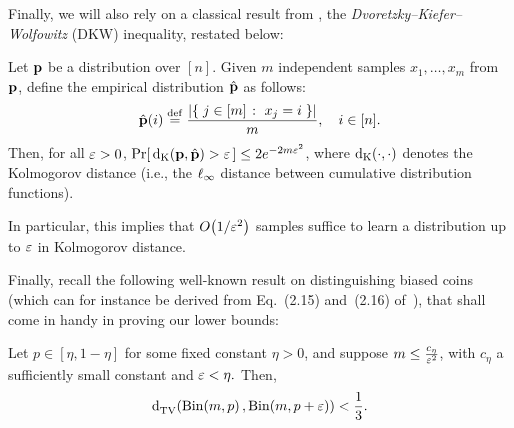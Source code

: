 Finally, we will also rely on a classical result from , the \emph{Dvoretzky--Kiefer--Wolfowitz} (DKW) inequality, restated below:
\begin{theorem}\label{theo:dkw:ineq}
Let $\D$ be a distribution over $[n]$. Given $m$ independent samples $x_1,\dots ,x_m$ from $\D$, define the empirical distribution $\hat{\D}$ as follows:
\[
\hat{\D}(i) \eqdef \frac{\abs{ \setOfSuchThat{j\in[m]}{x_j=i} } }{m}, \quad i\in[n].
\]
Then, for all $\eps > 0$, $\probaOf{ \kolmogorov{\D}{\hat{\D}} > \eps } \leq 2e^{-2m\eps^2}$, where $\kolmogorov{\cdot}{\cdot}$ denotes the Kolmogorov distance (i.e., the $\lp[\infty]$ distance between cumulative distribution functions).
\end{theorem} 
\noindent In particular, this implies that $\bigO{1/\eps^2}$ samples suffice to learn a distribution up to $\eps$ in Kolmogorov distance.

Finally, recall the following well-known result on distinguishing biased coins (which can for instance be derived from Eq.~(2.15) and~(2.16) of~\cite{AdellJodra:06}), that shall come in handy in proving our lower bounds:
\begin{fact}\label{fact:fair:biased:coin}
Let $p\in[\eta, 1-\eta]$ for some fixed constant $\eta > 0$, and suppose $m\leq\frac{c_\eta}{\eps^2}$, with $c_\eta$ a sufficiently small constant
and $\eps < \eta.$ Then,
\[ \totalvardist{ \binomial{m}{p} }{ \binomial{m}{p+\eps} } < \frac{1}{3}. \]
\end{fact}


